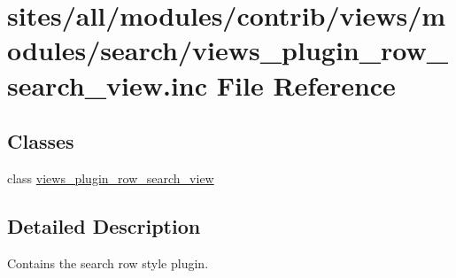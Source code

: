 \hypertarget{views__plugin__row__search__view_8inc}{
\section{sites/all/modules/contrib/views/modules/search/views\_\-plugin\_\-row\_\-search\_\-view.inc File Reference}
\label{views__plugin__row__search__view_8inc}
}
\subsection*{Classes}
\begin{CompactItemize}
\item 
class \hyperlink{classviews__plugin__row__search__view}{views\_\-plugin\_\-row\_\-search\_\-view}
\end{CompactItemize}


\subsection{Detailed Description}
Contains the search row style plugin. 